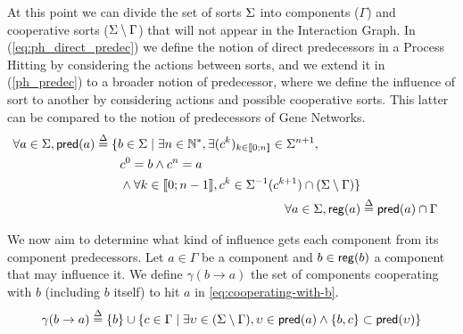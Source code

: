 At this point we can divide the set of sorts $\Sigma$ into components ($\Gamma$) and cooperative sorts
($\Sigma \setminus \Gamma$) that will not appear in the Interaction Graph. In (\ref{eq:ph_direct_predec})
we define the notion of direct predecessors in a Process Hitting by considering the actions between
sorts, and we extend it in (\ref{ph_predec}) to a broader notion of predecessor, where we define the
influence of sort to another by considering actions and possible cooperative sorts. This latter can
be compared to the notion of predecessors of Gene Networks. 
\begin{align}
\begin{split}
\forall a \in \Sigma, \mathsf{pred}(a) &\stackrel{\Delta}= \{b \in \Sigma \mid \exists n \in \mathbb{N}^*, \exists (c^k)_{k \in \llbracket 0 ; n \rrbracket} \in \Sigma^{n+1}, \\
                                   & \quad \quad c^0 = b \wedge c^n = a \\
                                   & \quad \quad \wedge \forall k \in \llbracket 0 ; n-1 \rrbracket,
								   c^k \in \Sigma^{-1}(c^{k+1}) \cap (\Sigma\setminus\Gamma)\}
\end{split}
\label{ph_predec}
\\
\forall a\in \Sigma, \mathsf{reg}({a}) & \stackrel{\Delta}= \mathsf{pred}(a) \cap \Gamma
\label{eq:regulators}
\end{align}

We now aim to determine what kind of influence gets each component from its component predecessors.
Let $a \in \Gamma$ be a component and $b \in \mathsf{reg}({b})$ a component that may influence it.
We define $\gamma(b\rightarrow a)$ the set of components cooperating with $b$ (including $b$ itself)
to hit $a$ in \eqref{eq:cooperating-with-b}.
\begin{align}
\begin{split}
\gamma(b\rightarrow a) \stackrel{\Delta}= \{ b \} \cup \{ c \in \Gamma \mid 
			\exists \upsilon\in(\Sigma\setminus\Gamma),
				\upsilon\in\mathsf{pred}(a) \wedge \{b,c\}\subset\mathsf{pred}(\upsilon) \}
\end{split}
\label{eq:cooperating-with-b}
\end{align}


